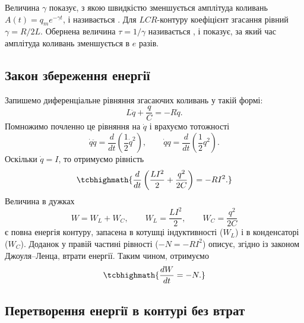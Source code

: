 Величина $\gamma$ показує, з якою швидкістю зменшується амплітуда коливань $A(t) = q_m e^{-\gamma t}$, і називається . Для $LCR$-контуру коефіцієнт згасання рівний $\gamma = R/2L$. Обернена величина $\tau = 1/\gamma$ називається , і показує, за який
час амплітуда коливань зменшується в $e$ разів.

\subsection*{Закон збереження енергії}

Запишемо диференціальне рівняння згасаючих коливань у такій формі:
\begin{equation}\label{eq:damped_equation_energy}
	L\ddot{q} + \frac{q}{C} = -R\dot{q}.
\end{equation}
Помножимо почленно це рівняння на $\dot{q}$ і врахуємо тотожності
\begin{equation}\label{eq:identities}
	\dot{q}\ddot{q} = \frac{d}{dt}\left(\frac{1}{2}\dot{q}^2\right), \qquad
	\dot{q}q = \frac{d}{dt}\left(\frac{1}{2}q^2\right).
\end{equation}
Оскільки $\dot{q} = I$, то отримуємо рівність
\begin{equation}\label{eq:energy_balance}
	\tcbhighmath{
		\frac{d}{dt}\left(\frac{LI^2}{2} + \frac{q^2}{2C}\right) = -RI^2.
	}
\end{equation}
Величина в дужках
\begin{equation}\label{eq:total_energy}
	W = W_L + W_C, \qquad W_L = \frac{LI^2}{2}, \qquad W_C = \frac{q^2}{2C}
\end{equation}
є повна енергія контуру, запасена в котушці індуктивності ($W_L$) і в конденсаторі ($W_C$). Доданок у правій частині рівності ($-N = -RI^2$) описує, згідно із законом Джоуля--Ленца, втрати енергії. Таким чином, отримуємо
\begin{equation}\label{eq:energy_loss}
	\tcbhighmath{
		\frac{dW}{dt} = -N.
	}
\end{equation}

\subsection*{Перетворення енергії в контурі без втрат}

